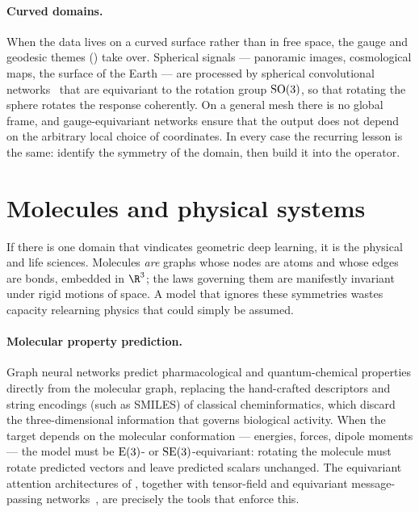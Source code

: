 \paragraph{Curved domains.}
When the data lives on a curved surface rather than in free space, the gauge and
geodesic themes () take over. Spherical signals ---
panoramic images, cosmological maps, the surface of the Earth --- are processed
by spherical convolutional networks~\citep{cohen2018sphericalcnns} that are
equivariant to the rotation group $\mathrm{SO}(3)$, so that rotating the sphere rotates
the response coherently. On a general mesh there is no global frame, and
gauge-equivariant networks ensure that the output does not depend on the
arbitrary local choice of coordinates. In every case the recurring lesson is the
same: identify the symmetry of the domain, then build it into the operator.

\section{Molecules and physical systems}
\label{sec:apps:molecules}

If there is one domain that vindicates geometric deep learning, it is the
physical and life sciences. Molecules \emph{are} graphs whose nodes are atoms
and whose edges are bonds, embedded in $\R^3$; the laws governing them are
manifestly invariant under rigid motions of space. A model that ignores these
symmetries wastes capacity relearning physics that could simply be assumed.

\paragraph{Molecular property prediction.}
Graph neural networks predict pharmacological and quantum-chemical properties
directly from the molecular graph, replacing the hand-crafted descriptors and
string encodings (such as SMILES) of classical cheminformatics, which discard
the three-dimensional information that governs biological activity. When the
target depends on the molecular conformation --- energies, forces, dipole
moments --- the model must be $\mathrm{E}(3)$- or $\mathrm{SE}(3)$-equivariant: rotating the
molecule must rotate predicted vectors and leave predicted scalars unchanged.
The equivariant attention architectures of , together
with tensor-field and equivariant message-passing networks~\citep{satorras2021enequivariant},
are precisely the tools that enforce this.

